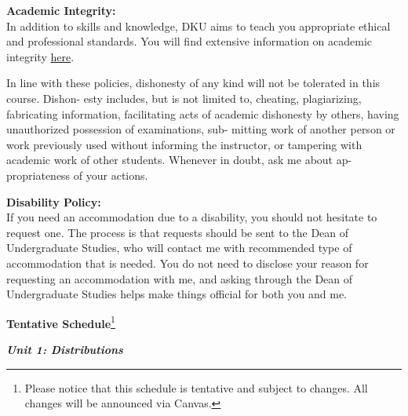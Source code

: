 \documentclass[11pt]{article}
\begin{document}
\vspace{0.5cm}
\large \textbf{Academic Integrity:}\\[0.5em]
In addition to skills and knowledge, DKU aims to teach you appropriate ethical and professional standards. You will find extensive information on academic integrity \href{https://ugstudies.dukekunshan.edu.cn/academic-integrity/}{here}.

In line with these policies, dishonesty of any kind will not be tolerated in this course. Dishon- esty includes, but is not limited to, cheating, plagiarizing, fabricating information, facilitating acts of academic dishonesty by others, having unauthorized possession of examinations, sub- mitting work of another person or work previously used without informing the instructor, or tampering with academic work of other students. Whenever in doubt, ask me about ap- propriateness of your actions.

\vspace{0.5cm}
\large \textbf{Disability Policy:}\\[0.5em]
If you need an accommodation due to a disability, you should not hesitate to request one. The process is that requests should be sent to the Dean of Undergraduate Studies, who will contact me with recommended type of accommodation that is needed. You do not need to disclose your reason for requesting an accommodation with me, and asking through the Dean of Undergraduate Studies helps make things official for both you and me.







\newpage
\Large \begin{center}
\textbf{Tentative Schedule}\footnote{Please notice that this schedule is tentative and subject to changes. All changes will be announced via Canvas.}
\end{center}

\Large \textit{\textbf{Unit 1: Distributions}} \\
\end{document}
